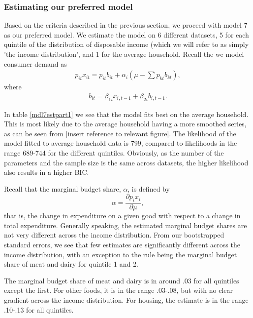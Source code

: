 \subsubsection{Estimating our preferred model}\label{LESresults}
Based on the criteria described in the previous section, we proceed with model 7 as our preferred model. We estimate the model on 6 different datasets, 5 for each quintile of the distribution of disposable income (which we will refer to as simply 'the income distribution', and 1 for the average household. 
Recall the we model consumer demand as
\begin{align}
    p_{it} x_{it} = p_{it} b_{it} + \alpha_i(\mu - \sum p_{kt} b_{kt}),
\end{align}
where
\begin{align} \label{eq:habitform}
    b_{it} = \beta_{1i} x_{i,t-1} + \beta_{2i} b_{i,t-1}.
\end{align}

In table \ref{mdl7estpart1} we see that the model fits best on the average household. This is most likely due to the average household having a more smoothed series, as can be seen from [insert reference to relevant figure]. The likelihood of the model fitted to average household data is 799, compared to likelihoods in the range 689-744 for the different quintiles. Obviously, as the number of the parameters and the sample size is the same across datasets, the higher likelihood also results in a higher BIC. 

Recall that the marginal budget share, $\alpha$, is defined by
\begin{equation}
    \alpha= \frac{\partial p_i x_i}{\partial \mu},
\end{equation}
that is, the change in expenditure on a given good with respect to a change in total expenditure. Generally speaking, the estimated marginal budget shares are not very different across the income distribution. From our bootstrapped standard errors, we see that few estimates are significantly different across the income distribution, with an exception to the rule being the marginal budget share of meat and dairy for quintile 1 and 2. 

The marginal budget share of meat and dairy is in around .03 for all quintiles except the first. For other foods, it is in the range .03-.08, but with no clear gradient across the income distribution. For housing, the estimate is in the range .10-.13 for all quintiles.

